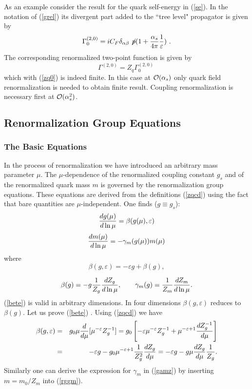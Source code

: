 \documentclass[12pt,rotate]{article}
\def\eps{\varepsilon}
\newcommand{\eqn}{\ref}
\newcommand{\bea}{\begin{eqnarray}}
\newcommand{\eea}{\end{eqnarray}}
\newcommand{\be}{\begin{equation}}
\newcommand{\ee}{\end{equation}}
\newcommand{\ord}{{\cal O}}
\begin{document}
\begin{itemize}
As an example consider the result for the quark self-energy in
(\ref{se}). In the notation of (\ref{grel})
its divergent part added to the ``tree level" propagator is
given by
\begin{equation}
\Gamma_0^{(2,0)}=i C_F \delta_{\alpha\beta}\not\! p (1+ 
\frac{\alpha_s}{4\pi} \frac{1}{\varepsilon})~. 
\end{equation}
The corresponding renormalized two-point function is given by
\be
\Gamma^{(2,0)}=Z_q \Gamma_0^{(2,0)}~
\ee
which with (\ref{zq0}) is indeed finite. In this case at $\ord(\alpha_s)$
only quark field renormalization is needed to obtain finite result.
Coupling renormalization is necessary first at $\ord(\alpha_s^2)$.
\subsection{Renormalization Group Equations}
\subsubsection{The Basic Equations}
In the process of renormalization we have introduced an arbitrary
mass parameter $\mu$. The $\mu$-dependence of the renormalized
coupling constant $g_s$ and of the renormalized quark mass $m$
is governed by the renormalization group equations.
These equations are derived from the
definitions (\eqn{zqcd}) using the fact  that bare quantities are
$\mu$-independent. 
One finds ($g\equiv g_s$):
\begin{equation}\label{rgbe}
{dg(\mu)\over d\ln\mu}=\beta(g(\mu), \eps)  \end{equation}
\begin{equation}\label{rggm}
{d m(\mu)\over d\ln\mu}=-\gamma_m(g(\mu)) m(\mu)  \end{equation}
where
\begin{equation}\label{bete}
\beta(g, \eps)= -\eps g+\beta(g),  \end{equation}

\begin{equation}\label{gamz} 
\beta(g)=-g{1\over Z_g}{d Z_g\over d\ln\mu},\quad\quad
\gamma_m(g)={1\over Z_m}{d Z_m\over d\ln\mu}.
  \end{equation}
(\ref{bete}) is valid in arbitrary
dimensions. In four dimensions $\beta(g, \eps)$ reduces to $\beta(g)$.
Let us prove (\ref{bete}) \cite{Gross}. Using (\eqn{zqcd}) we have 
\bea\label{prove1}
\beta(g,\eps) &=& g_0 \mu {d\over d\mu} [\mu^{-\eps} Z_g^{-1}]
= g_0 
\left[-\eps \mu^{-\eps} Z_g^{-1} + \mu^{-\eps+1}\frac{d Z_g^{-1}}{d\mu}\right]
\nonumber\\ 
&= &-\eps g-g_0 \mu^{-\eps+1}{1\over Z^2_g}{d Z_g \over d\mu}
=-\eps g-g\mu {d Z_g \over d\mu}{1\over Z_g}.
\eea
Similarly one can derive the expression for $\gamma_m$ in (\ref{gamz})
by inserting $m=m_0/Z_m$ into (\ref{rggm}).


\end{itemize}
\end{document}
